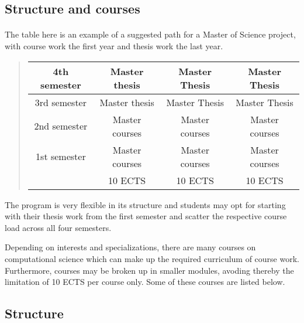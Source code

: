\documentclass[%
twoside,                 %
final,                   %
10pt]{article}
\begin{document}
\subsection{Structure and courses}

\paragraph{}
The table here is an example of a suggested path for a Master of Science project,
with course work the first year and thesis work the last year. 

\begin{quote}
\begin{tabular}{cccc}
\hline
\multicolumn{1}{c}{ 4th semester } & \multicolumn{1}{c}{ Master thesis } & \multicolumn{1}{c}{ Master Thesis } & \multicolumn{1}{c}{ Master Thesis } \\
\hline
3rd semester & Master thesis  & Master Thesis  & Master Thesis  \\
\hline
2nd semester & Master courses & Master courses & Master courses \\
\hline
1st semester & Master courses & Master courses & Master courses \\
\hline
             & 10 ECTS        & 10 ECTS        & 10 ECTS        \\
\hline
\end{tabular}
\end{quote}

\noindent
The program is very flexible in its structure and students may opt for starting with their thesis 
work from the first semester and scatter the respective course load across all four semesters.

Depending on interests and specializations, there are many courses on computational science which can make 
up the required curriculum of course work. Furthermore, courses may be broken up in smaller modules,
avoding thereby the limitation of 10 ECTS per course only. Some of these courses are listed below.




\subsection{Structure}

\end{document}
